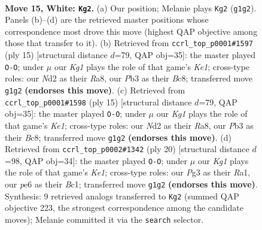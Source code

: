 \documentclass[11pt]{article}
\begin{document}
\clearpage

\begin{figure}[p]\centering
\begin{subfigure}{0.46\textwidth}\centering
\resizebox{\linewidth}{!}{%
\newchessgame
\chessboard[
  setfen={rnbqr1k1/p3bp1p/2p1p1p1/1p1n4/3P4/1P1Q1BP1/P2NPP1P/RNB2RK1 w - - 1 15},
  showmover=false,
  pgfstyle=straightmove, color=movearrow, markmove={g1-g2}
]}
\caption{}
\end{subfigure}\hfill
\begin{subfigure}{0.46\textwidth}\centering
\resizebox{\linewidth}{!}{%
\newchessgame
\chessboard[
  setfen={r1bqk2r/ppp1npbp/2np2p1/8/2PNP3/2N1B1P1/PP3P1P/R2QKB1R b KQkq - 2 8},
  showmover=false,
  pgfstyle=straightmove, color=movearrow, markmove={e8-g8}
]}
\caption{}
\end{subfigure}
\\[4pt]
\begin{subfigure}{0.46\textwidth}\centering
\resizebox{\linewidth}{!}{%
\newchessgame
\chessboard[
  setfen={r1bqk2r/ppp1npbp/2np2p1/8/2PNP3/2N1B1P1/PP3P1P/R2QKB1R b KQkq - 2 8},
  showmover=false,
  pgfstyle=straightmove, color=movearrow, markmove={e8-g8}
]}
\caption{}
\end{subfigure}\hfill
\begin{subfigure}{0.46\textwidth}\centering
\resizebox{\linewidth}{!}{%
\newchessgame
\chessboard[
  setfen={1r1qkb1r/1bpn1ppp/p3p3/1p1nP3/3P4/2NQ1N2/PP2BPPP/R1B1K2R w KQk - 1 11},
  showmover=false,
  pgfstyle=straightmove, color=movearrow, markmove={e1-g1}
]}
\caption{}
\end{subfigure}
\caption{\textbf{Move 15, White: \texttt{Kg2}.} (a) Our position; Melanie plays \texttt{Kg2} (\texttt{g1g2}). Panels (b)--(d) are the retrieved master positions whose correspondence most drove this move (highest QAP objective among those that transfer to it). (b) Retrieved from \texttt{ccrl\_top\_p0001\#1597} (ply 15) [structural distance $d$=79, QAP obj=35]: the master played \texttt{O-O}; under $\mu$ our \emph{Kg1} plays the role of that game's \emph{Ke1}; cross-type roles: our \emph{N}d2 as their \emph{R}a8, our \emph{P}b3 as their \emph{B}c8; transferred move \texttt{g1g2} \textbf{(endorses this move)}. (c) Retrieved from \texttt{ccrl\_top\_p0001\#1598} (ply 15) [structural distance $d$=79, QAP obj=35]: the master played \texttt{O-O}; under $\mu$ our \emph{Kg1} plays the role of that game's \emph{Ke1}; cross-type roles: our \emph{N}d2 as their \emph{R}a8, our \emph{P}b3 as their \emph{B}c8; transferred move \texttt{g1g2} \textbf{(endorses this move)}. (d) Retrieved from \texttt{ccrl\_top\_p0002\#1342} (ply 20) [structural distance $d$=98, QAP obj=34]: the master played \texttt{O-O}; under $\mu$ our \emph{Kg1} plays the role of that game's \emph{Ke1}; cross-type roles: our \emph{P}g3 as their \emph{R}a1, our \emph{p}e6 as their \emph{B}c1; transferred move \texttt{g1g2} \textbf{(endorses this move)}. Synthesis: 9 retrieved analogs transferred to \texttt{Kg2} (summed QAP objective 223, the strongest correspondence among the candidate moves); Melanie committed it via the \texttt{search} selector.}
\label{fig:thought-m28}
\end{figure}
\end{document}
